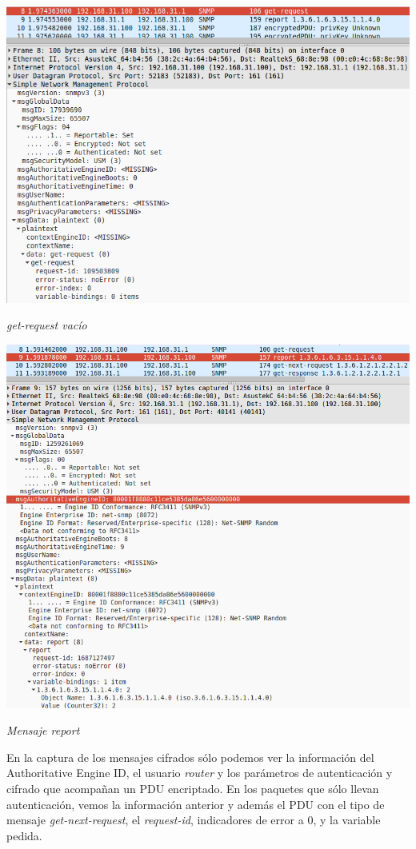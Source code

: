 \documentclass[]{article}
\begin{document}
\begin{center}
	\includegraphics[scale=0.45]{images/snmp/snmp1.png}
	
	\textit{get-request vacío}
\end{center}

\begin{center}
	\includegraphics[scale=0.45]{images/snmp/snmp2.png}
	
	\textit{Mensaje report}
\end{center}

En la captura de los mensajes cifrados sólo podemos ver la información del Authoritative Engine ID, el usuario \textit{router} y los parámetros de autenticación y cifrado que acompañan un PDU encriptado. En los paquetes que sólo llevan autenticación, vemos la información anterior y además el PDU con el tipo de mensaje \textit{get-next-request}, el \textit{request-id}, indicadores de error a 0, y la variable pedida.
\end{document}
